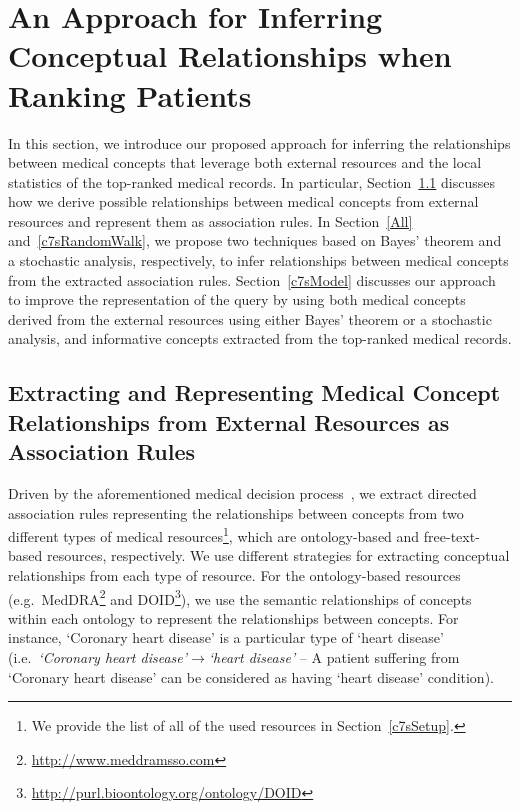 \documentclass[1p]{elsarticle}
\begin{document}
\section{An Approach for Inferring Conceptual Relationships when Ranking Patients}\label{Approach}
In this section, we introduce our proposed approach for inferring the relationships between medical concepts that leverage both external resources and the local statistics of the top-ranked medical records. In particular, Section~\ref{c7sRules} discusses how we derive possible relationships between medical concepts from external resources and represent them as association rules. In Section~\ref{All} and~\ref{c7sRandomWalk}, we propose two techniques based on Bayes' theorem and a stochastic analysis, respectively, to infer relationships between medical concepts from the extracted association rules. Section~\ref{c7sModel} discusses our approach to improve the representation of the query by using both medical concepts derived from the external resources using either Bayes' theorem or a stochastic analysis, and informative concepts extracted from the top-ranked medical records.

\subsection{Extracting and Representing Medical Concept Relationships from External Resources as Association Rules}\label{c7sRules}

Driven by the aforementioned medical decision process~\cite{limsopatham2013ecir-b}, we extract directed association rules representing the relationships between concepts from two different types of medical resources\footnote{We provide the list of all of the used resources in Section~\ref{c7sSetup}.}, which are ontology-based and free-text-based resources, respectively. We use different strategies for extracting conceptual relationships from each type of resource. For the ontology-based resources (e.g.\ MedDRA\footnote{\url{http://www.meddramsso.com}} and DOID\footnote{\url{http://purl.bioontology.org/ontology/DOID}}), we use the semantic relationships of concepts within each ontology to represent the relationships between concepts. For instance, `Coronary heart disease' is a particular type of `heart disease' (i.e.\ \emph{`Coronary heart disease'$\rightarrow$`heart disease'} -- A patient suffering from `Coronary heart disease' can be considered as having `heart disease' condition). 
\end{document}

